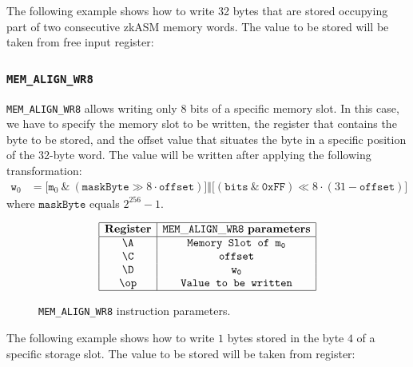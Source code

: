 The following example shows how to write 32 bytes that are stored occupying part of two consecutive zkASM memory words. The value to be stored will be taken from free input register:


\subsubsection{\texttt{MEM\_ALIGN\_WR8}}

\texttt{MEM\_ALIGN\_WR8} allows writing only 8 bits of a specific memory slot. In this case, we have to specify the memory slot to be written, the register that contains the byte to be stored, and the offset value that situates the byte in a specific position of the 32-byte word. The value will be written after applying the following transformation:
\begin{align*}
\texttt{w}_0 &= \Bigr[ \texttt{m}_0 \ \texttt{\&} \ \left( \texttt{maskByte} \gg 8 \cdot \texttt{offset} \right) \Bigr]  \mathbin\Vert \Bigr[ \left( \texttt{bits} \ \texttt{\&} \ \texttt{0xFF} \right)  \ll 8 \cdot \left( 31-\texttt{offset}\right) \Bigr] 
\end{align*}
where $\texttt{maskByte}$ equals $2^{256} - 1$. 

\begin{figure}[h!]
\renewcommand{\figurename}{Table}
\[
\begin{array}{|c|c|}
\hline
\mathbf{Register} &\mathtt{MEM\_ALIGN\_WR8} \ \textbf{parameters} \\ \hline
\A & \texttt{Memory Slot of } \mathtt{m_0} \\
\C & \mathtt{offset} \\
\D & \mathtt{w_0} \\
\op& \texttt{Value to be written} \\
\hline
\end{array}
\]
\caption{\texttt{MEM\_ALIGN\_WR8} instruction parameters.}
\label{tab:memory-first-example}
\end{figure}

The following example shows how to write $1$ bytes stored in the byte $4$ of a specific storage slot. The value to be stored will be taken from \B register:

